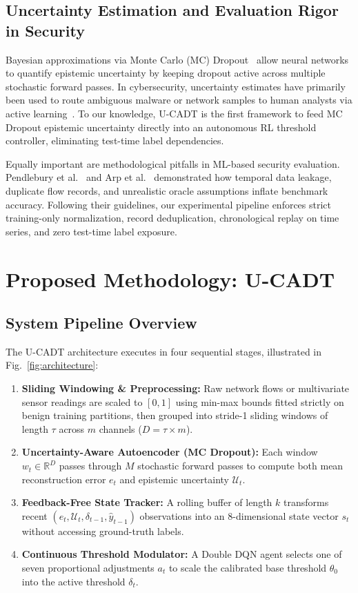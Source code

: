 \documentclass[conference]{IEEEtran}
\begin{document}
\subsection{Uncertainty Estimation and Evaluation Rigor in Security}
Bayesian approximations via Monte Carlo (MC) Dropout~\cite{gal2016dropout} allow neural networks to quantify epistemic uncertainty by keeping dropout active across multiple stochastic forward passes. In cybersecurity, uncertainty estimates have primarily been used to route ambiguous malware or network samples to human analysts via active learning~\cite{arp2022dos}. To our knowledge, U-CADT is the first framework to feed MC Dropout epistemic uncertainty directly into an autonomous RL threshold controller, eliminating test-time label dependencies.

Equally important are methodological pitfalls in ML-based security evaluation. Pendlebury et al.~\cite{tesseract2019} and Arp et al.~\cite{arp2022dos} demonstrated how temporal data leakage, duplicate flow records, and unrealistic oracle assumptions inflate benchmark accuracy. Following their guidelines, our experimental pipeline enforces strict training-only normalization, record deduplication, chronological replay on time series, and zero test-time label exposure.

\section{Proposed Methodology: U-CADT}

\subsection{System Pipeline Overview}
The U-CADT architecture executes in four sequential stages, illustrated in Fig.~\ref{fig:architecture}:
\begin{enumerate}
    \item \textbf{Sliding Windowing \& Preprocessing:} Raw network flows or multivariate sensor readings are scaled to $[0, 1]$ using min-max bounds fitted strictly on benign training partitions, then grouped into stride-1 sliding windows of length $\tau$ across $m$ channels ($D = \tau \times m$).
    \item \textbf{Uncertainty-Aware Autoencoder (MC Dropout):} Each window $w_t \in \mathbb{R}^D$ passes through $M$ stochastic forward passes to compute both mean reconstruction error $e_t$ and epistemic uncertainty $\mathcal{U}_t$.
    \item \textbf{Feedback-Free State Tracker:} A rolling buffer of length $k$ transforms recent $(e_t, \mathcal{U}_t, \delta_{t-1}, \hat{y}_{t-1})$ observations into an 8-dimensional state vector $s_t$ without accessing ground-truth labels.
    \item \textbf{Continuous Threshold Modulator:} A Double DQN agent selects one of seven proportional adjustments $a_t$ to scale the calibrated base threshold $\theta_0$ into the active threshold $\delta_t$.
\end{enumerate}
\end{document}
